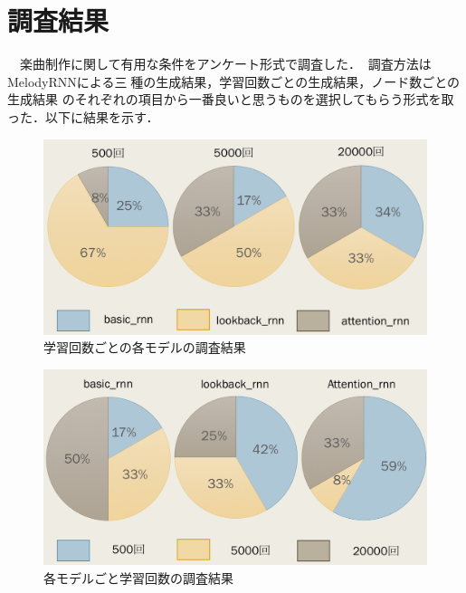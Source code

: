\section{調査結果}
　楽曲制作に関して有用な条件をアンケート形式で調査した．調査方法はMelodyRNNによる三種の生成結果，学習回数ごとの生成結果，ノード数ごとの生成結果
のそれぞれの項目から一番良いと思うものを選択してもらう形式を取った．以下に結果を示す．
\begin{figure}[h]
    \begin{screen}
    \begin{center}
        \includegraphics[scale=0.5, clip]{./img/glaph1.png}
        \caption{学習回数ごとの各モデルの調査結果}
        \label{fig:学習回数ごと各モデルの調査結果}
    \end{center}
    \end{screen}
\end{figure}
\begin{figure}[h]
    \begin{screen}
    \begin{center}
        \includegraphics[scale=0.5, clip]{./img/glaph2.png}
        \caption{各モデルごと学習回数の調査結果}
        \label{fig:各モデルごとの学習回数の調査結果}
    \end{center}
    \end{screen}
\end{figure}

